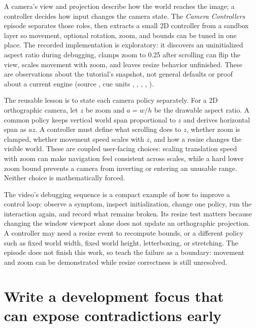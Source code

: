 A camera's view and projection describe how the world reaches the image; a controller decides how input changes the camera state. The \emph{Camera Controllers} episode separates those roles, then extracts a small 2D controller from a sandbox layer so movement, optional rotation, zoom, and bounds can be tuned in one place. The recorded implementation is exploratory: it discovers an uninitialized aspect ratio during debugging, clamps zoom to 0.25 after scrolling can flip the view, scales movement with zoom, and leaves resize behavior unfinished. These are observations about the tutorial's snapshot, not general defaults or proof about a current engine (source , cue units , , , , ).

The reusable lesson is to state each camera policy separately. For a 2D orthographic camera, let \(z\) be zoom and \(a=w/h\) be the drawable aspect ratio. A common policy keeps vertical world span proportional to \(z\) and derives horizontal span as \(az\). A controller must define what scrolling does to \(z\), whether zoom is clamped, whether movement speed scales with \(z\), and how a resize changes the visible world. These are coupled user-facing choices: scaling translation speed with zoom can make navigation feel consistent across scales, while a hard lower zoom bound prevents a camera from inverting or entering an unusable range. Neither choice is mathematically forced.

The video's debugging sequence is a compact example of how to improve a control loop: observe a symptom, inspect initialization, change one policy, run the interaction again, and record what remains broken. Its resize test matters because changing the window viewport alone does not update an orthographic projection. A controller may need a resize event to recompute bounds, or a different policy such as fixed world width, fixed world height, letterboxing, or stretching. The episode does not finish this work, so teach the failure as a boundary: movement and zoom can be demonstrated while resize correctness is still unresolved.

\section{Write a development focus that can expose contradictions early}\label{06-engine-ii-ch046-write-a-development-focus-that-can-expose-contradictions-early}

